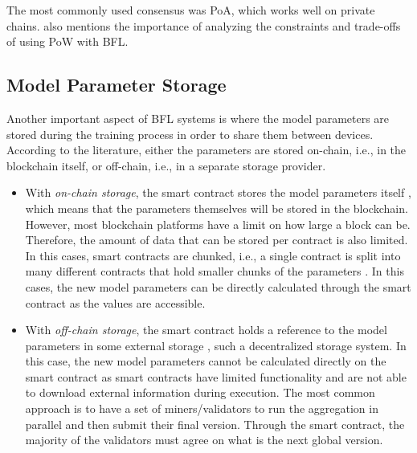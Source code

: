  The most commonly used consensus was PoA, which works well on private chains. \cite{10.48550/arxiv.2112.07938} also mentions the importance of analyzing the constraints and trade-offs of using PoW with BFL.  

\subsection{Model Parameter Storage}

Another important aspect of BFL systems is where the model parameters are stored during the training process in order to share them between devices. According to the literature, either the parameters are stored on-chain, i.e., in the blockchain itself, or off-chain, i.e., in a separate storage provider.

\begin{itemize}
    \item With \textit{on-chain storage}, the smart contract stores the model parameters itself \cite{9274451, baffle, demo, 8733825, 9524833, 8894364, 9184854, 8893114}, which means that the parameters themselves will be stored in the blockchain. However, most blockchain platforms have a limit on how large a block can be. Therefore, the amount of data that can be stored per contract is also limited. In this cases, smart contracts are chunked, i.e., a single contract is split into many different contracts that hold smaller chunks of the parameters \cite{9274451, baffle}. In this cases, the new model parameters can be directly calculated through the smart contract as the values are accessible.
    
    \item With \textit{off-chain storage}, the smart contract holds a reference to the model parameters in some external storage \cite{10.48550/arxiv.2202.02817, 10.48550/arxiv.1910.12603, 10.48550/arxiv.2007.03856, 8945913, Peyvandi2022, 9170559, 10.1145/3319535.3363256, 10.48550/arxiv.2011.07516}, such a decentralized storage system. In this case, the new model parameters cannot be calculated directly on the smart contract as smart contracts have limited functionality and are not able to download external information during execution. The most common approach is to have a set of miners/validators to run the aggregation in parallel and then submit their final version. Through the smart contract, the majority of the validators must agree on what is the next global version. 
\end{itemize}

